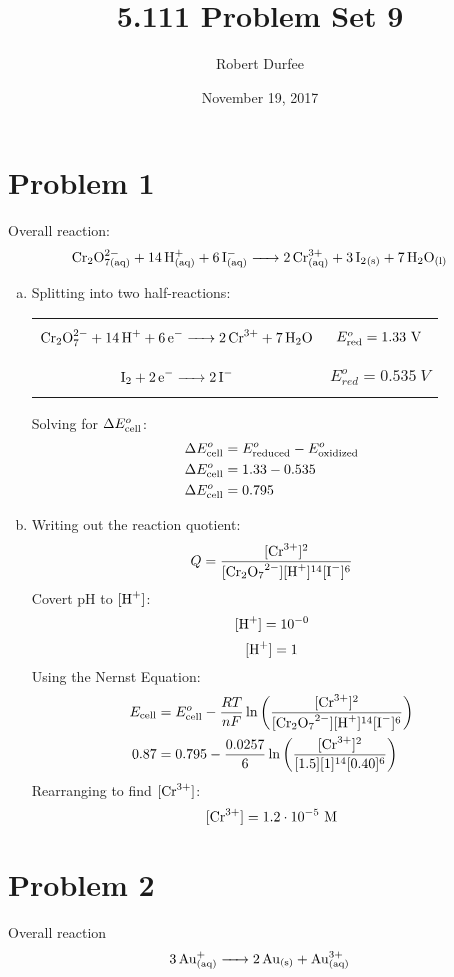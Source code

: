 \documentclass{article}
\title{ 5.111 Problem Set 9 }
\author{ Robert Durfee }
\date{ November 19, 2017 }
\begin{document}
\maketitle

\section*{ Problem 1 }

Overall reaction:
$$\ce{Cr_2O^{2-}_{7(aq)} + 14H^+_{(aq)} + 6I^-_{(aq)} -> 2Cr^{3+}_{(aq)} + 3I_2_{(s)} +
7H_2O_{(l)}}$$

\begin{enumerate}[a.]
    \item Splitting into two half-reactions:
        \begin{center}
            \begin{tabular}{c c}
                $$\ce{Cr_2O^{2-}_7 + 14H+ + 6e- -> 2Cr^{3+} + 7H_2O}$$ &
                $E^o_{\rm{red}}=1.33\ \si{V}$ \\
                $$\ce{I_2 + 2e- -> 2I^- }$$ & $E^o_{red}=0.535\ \si{V}$ 
            \end{tabular}
        \end{center}
        Solving for $\Delta E^o_{\rm{cell}}$:
        \begin{align*}
            \Delta E^o_{\rm{cell}} &= E^o_{\rm{reduced}} - E^o_{\rm{oxidized}} \\
            \Delta E^o_{\rm{cell}} &= 1.33 - 0.535 \\
            \Delta E^o_{\rm{cell}} &= 0.795
        \end{align*}
    \item Writing out the reaction quotient:
        $$Q=\frac{[\ce{Cr^{3+}}]^2}{[\ce{Cr_2O_7^{2-}}][\ce{H+}]^{14}[\ce{I-}]^6}$$
        Covert pH to $[\ce{H+}]$:
        $$[\ce{H+}] = 10^{-0}$$
        $$[\ce{H+}] = 1$$
        Using the Nernst Equation:
        \begin{align*}
            E_{\rm{cell}} &= E_{\rm{cell}}^o -
            \frac{RT}{nF}\ln\left(\frac{[\ce{Cr^{3+}}]^2}
            {[\ce{Cr_2O_7^{2-}}][\ce{H+}]^{14}[\ce{I-}]^6}\right) \\
            0.87 &= 0.795 - \frac{0.0257}{6}\ln\left(\frac{[\ce{Cr^{3+}}]^2}
            {[1.5][1]^{14}[0.40]^6}\right)
        \end{align*}
        Rearranging to find $[\ce{Cr^{3+}}]$:
        $$[\ce{Cr^{3+}}] = 1.2 \cdot 10^{-5}\ \si{M}$$
\end{enumerate}

\section*{ Problem 2 }
Overall reaction
$$\ce{3Au^+_{(aq)} -> 2Au_{(s)} + Au^{3+}_{(aq)}}$$
\end{document}
